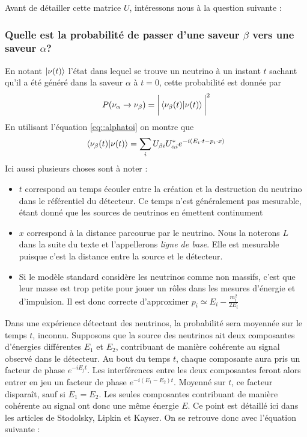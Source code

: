             Avant de détailler cette matrice $U$, intéressons nous à la question suivante : \\
            \subsubsection{Quelle est la probabilité de passer d'une saveur $\beta$ vers une saveur $\alpha$?}
            En notant $\ket{\nu(t)}$ l'état dans lequel se trouve un neutrino à un instant $t$ sachant qu'il a été généré dans la saveur $\alpha$ à $t=0$, cette probabilité est donnée par
            \begin{equation}
                P(\nu_{\alpha}\to\nu_{\beta})=\bigg|\braket{\nu_{\beta}(t)}{\nu(t)}\bigg|^2
            \end{equation}
            En utilisant l'équation \eqref{eq::alphatoi} on montre que
            \begin{equation}
                \braket{\nu_{\beta}(t)}{\nu(t)} = \sum_i U_{\beta i}U_{\alpha i}^* e^{-i(E_i\cdot t - p_i\cdot x)}
            \end{equation}
            Ici aussi plusieurs choses sont à noter : 
            \begin{itemize}
                \item $t$ correspond au temps écouler entre la création et la destruction du neutrino dans le référentiel du détecteur. Ce temps n'est généralement pas mesurable, étant donné que les sources de neutrinos en émettent continument
                \item $x$ correspond à la distance parcourue par le neutrino. Nous la noterons $L$ dans la suite du texte et l'appellerons \textit{ligne de base}. Elle est mesurable puisque c'est la distance entre la source et le détecteur.
                \item Si le modèle standard considère les neutrinos comme non massifs, c'est que leur masse est trop petite pour jouer un rôles dans les mesures d'énergie et d'impulsion. Il est donc correcte d'approximer $p_i \simeq E_i - \frac{m_i^2}{2E_i}$
            \end{itemize}
            Dans une expérience détectant des neutrinos, la probabilité sera moyennée sur le temps $t$, inconnu. Supposons que la source des neutrinos ait deux composantes d'énergies différentes $E_1$ et $E_2$, contribuant de manière cohérente au signal observé dans le détecteur. Au bout du temps $t$, chaque composante aura pris un facteur de phase $e^{-iE_jt}$. Les interférences entre les deux composantes feront alors entrer en jeu un facteur de phase $e^{-i(E_1-E_2)t}$. Moyenné sur $t$, ce facteur disparaît, sauf si $E_1 = E_2$. Les seules composantes contribuant de manière cohérente au signal ont donc une même énergie $E$. Ce point est détaillé ici dans les articles de Stodolsky\cite{Stodolsky1998}, Lipkin\cite{Lipkin2005} et Kayser\cite{Kayser2005}. On se retrouve donc avec l'équation suivante : 
